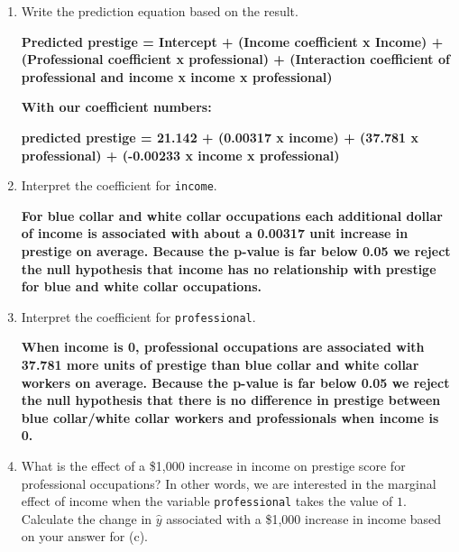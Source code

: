 \documentclass[12pt,letterpaper]{article}
\begin{document}
\begin{enumerate}
\begin{verbatim}
		Residual standard error: 8.012 on 94 degrees of freedom
		(4 observations deleted due to missingness)
		Multiple R-squared:  0.7872,	Adjusted R-squared:  0.7804 
		F-statistic: 115.9 on 3 and 94 DF,  p-value: < 0.00000000000000022
	\end{verbatim}	
\textbf{The R squared value tells us that the model explains 78.72 percent of the variation in prestige.}

	\item [(c)]
	Write the prediction equation based on the result.
	
	\textbf{Predicted prestige = Intercept + (Income coefficient x Income) + (Professional coefficient x professional) + (Interaction coefficient of professional and income x income x professional)}
	
	\textbf{With our coefficient numbers:}
	
	\textbf{predicted prestige = 21.142 + (0.00317 x income) + (37.781 x professional) + (-0.00233 x income x professional)}
	
	
		
	
\newpage
	\item [(d)]
	Interpret the coefficient for \texttt{income}.
	
	\textbf{For blue collar and white collar occupations each additional dollar of income is associated with about a 0.00317 unit increase in prestige on average. Because the p-value is far below 0.05 we reject the null hypothesis that income has no relationship with prestige for blue and white collar occupations.}

	\item [(e)]
	Interpret the coefficient for \texttt{professional}.
	
	\textbf{When income is 0, professional occupations are associated with 37.781 more units of prestige than blue collar and white collar workers on average. Because the p-value is far below 0.05 we reject the null hypothesis that there is no difference in prestige between blue collar/white collar workers and professionals when income is 0.}
	
	\item [(f)]
	What is the effect of a \$1,000 increase in income on prestige score for professional occupations? In other words, we are interested in the marginal effect of income when the variable \texttt{professional} takes the value of $1$. Calculate the change in $\hat{y}$ associated with a \$1,000 increase in income based on your answer for (c).
	

\end{enumerate}
\end{document}

